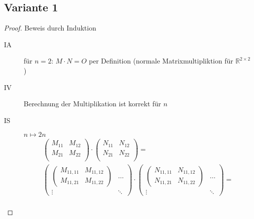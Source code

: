\documentclass[a4paper]{article}
\begin{document}
    \subsection*{Variante 1}
    \label{subsec:variante1}
    \begin{proof}
        Beweis durch Induktion

        \begin{description}
            \item[IA] für $n = 2$: $M \cdot N = O$ per Definition (normale Matrixmultipliktion für $\mathbb{R}^{2 \times 2}$)
            \item[IV] Berechnung der Multiplikation ist korrekt für $n$
            \item[IS] $n \longmapsto 2n$
            \nopagebreak
            \setlength{\jot}{10pt}
            \begin{gather*}
                \begin{pmatrix}
                    M_{11} & M_{12} \\
                    M_{21} & M_{22} \\
                \end{pmatrix} \cdot
                \begin{pmatrix}
                    N_{11} & N_{12} \\
                    N_{21} & N_{22} \\
                \end{pmatrix} = \\
                \begin{pmatrix}
                    \begin{pmatrix}
                        M_{11,11} & M_{11,12} \\
                        M_{11,21} & M_{11,22}
                    \end{pmatrix} & \ldots \\
                    \vdots & \ddots
                \end{pmatrix} \cdot
                \begin{pmatrix}
                    \begin{pmatrix}
                        N_{11,11} & N_{11,12} \\
                        N_{11,21} & N_{11,22}
                    \end{pmatrix} & \ldots \\
                    \vdots & \ddots
                \end{pmatrix} = \\

\end{gather*}
\end{description}
\end{proof}
\end{document}
